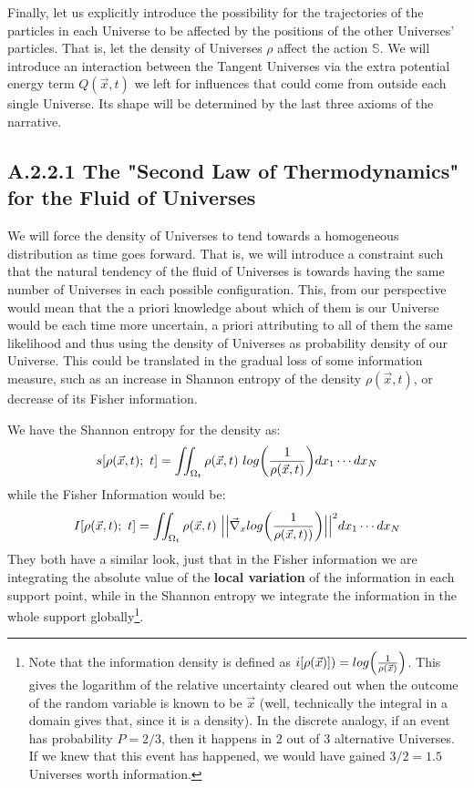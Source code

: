 \documentclass[11pt, a4paper]{article} %
\newcommand{\s}{\mathbb{S}}
\begin{document}
Finally, let us explicitly introduce the possibility for the trajectories of the particles in each Universe to be affected by the positions of the other Universes' particles. That is, let the density of Universes $\rho$ affect the action $\s$. We will introduce an interaction between the Tangent Universes via the extra potential energy term $Q(\vec{x},t)$ we left for influences that could come from outside each single Universe. Its shape will be determined by the last three axioms of the narrative.

\subsection*{A.2.2.1 The "Second Law of Thermodynamics" for the Fluid of Universes}

We will force the density of Universes to tend towards a homogeneous distribution as time goes forward. That is, we will introduce a constraint such that the natural tendency of the fluid of Universes is towards having the same number of Universes in each possible configuration. This, from our perspective would mean that the a priori knowledge about which of them is our Universe would be each time more uncertain, a priori attributing to all of them the same likelihood and thus using the density of Universes as probability density of our Universe. This could be translated in the gradual loss of some information measure, such as an increase in Shannon entropy of the density $\rho(\vec{x},t)$, or decrease of its Fisher information.

We have the Shannon entropy for the density as:
\begin{equation}
s[\rho(\vec{x},t);\ t]=\iint_{\Omega_t} \rho(\vec{x},t)\ log\qty(\frac{1}{\rho(\vec{x},t)}) dx_1\cdots dx_N
\end{equation}
while the Fisher Information would be:
\begin{equation}
I[\rho(\vec{x},t);\ t]=\iint_{\Omega_t} \rho(\vec{x},t)\ \Big|\Big|\vec{\nabla}_{x}log\qty(\frac{1}{\rho(\vec{x},t))})\Big|\Big|^2 dx_1\cdots dx_N
\end{equation}
They both have a similar look, just that in the Fisher information we are integrating the absolute value of the {\bf local variation} of the information in each support point, while in the Shannon entropy we integrate the information in the whole support globally\footnote{Note that the information density is defined as $i[\rho(\vec{x})])=log\qty(\frac{1}{\rho(\vec{x})})$. This gives the logarithm of the relative uncertainty cleared out when the outcome of the random variable is known to be $\vec{x}$ (well, technically the integral in a domain gives that, since it is a density). In the discrete analogy, if an event has probability $P=2/3$, then it happens in $2$ out of $3$ alternative Universes. If we knew that this event has happened, we would have gained $3/2=1.5$ Universes worth information.}.
\end{document}
